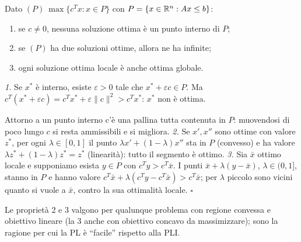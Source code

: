 \begin{prop}
Dato $(P)\ \max\{c^Tx: x\in P\}$ con $P=\{x\in\mathbb{R}^n:Ax\le b\}$:
\begin{enumerate}[nosep]
\item se $c\ne0$, nessuna soluzione ottima è un punto interno di $P$;
\item se $(P)$ ha due soluzioni ottime, allora ne ha infinite;
\item ogni soluzione ottima locale è anche ottima globale.
\end{enumerate}
\end{prop}
\begin{dimo}
\emph{1.} Se $x^*$ è interno, esiste $\varepsilon>0$ tale che $x^*+\varepsilon c\in P$. Ma $c^T(x^*+\varepsilon c)=c^Tx^*+\varepsilon\|c\|^2>c^Tx^*$: $x^*$ non è ottima.
\begin{center}
\end{center}
Attorno a un punto interno c'è una pallina tutta contenuta in $P$: muovendosi di poco lungo $c$ si resta ammissibili e si migliora.
\emph{2.} Se $x',x''$ sono ottime con valore $z^*$, per ogni $\lambda\in[0,1]$ il punto $\lambda x'+(1-\lambda)x''$ sta in $P$ (convesso) e ha valore $\lambda z^*+(1-\lambda)z^*=z^*$ (linearità): tutto il segmento è ottimo.
\emph{3.} Sia $\bar x$ ottimo locale e supponiamo esista $y\in P$ con $c^Ty>c^T\bar x$. I punti $\bar x+\lambda(y-\bar x)$, $\lambda\in(0,1]$, stanno in $P$ e hanno valore $c^T\bar x+\lambda(c^Ty-c^T\bar x)>c^T\bar x$; per $\lambda$ piccolo sono vicini quanto si vuole a $\bar x$, contro la sua ottimalità locale. \hfill$\square$
\end{dimo}
Le proprietà 2 e 3 valgono per qualunque problema con regione convessa e obiettivo lineare (la 3 anche con obiettivo concavo da massimizzare); sono la ragione per cui la PL è ``facile'' rispetto alla PLI.

